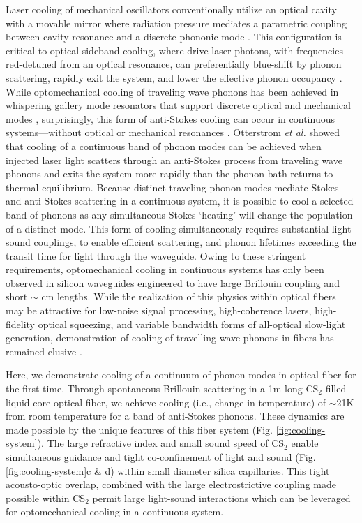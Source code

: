 Laser cooling of mechanical oscillators conventionally utilize an optical cavity with a movable mirror where radiation pressure mediates a parametric coupling between cavity resonance and a discrete phononic mode \citep{aspelmeyer2014cavity}. This configuration is critical to optical sideband cooling, where drive laser photons, with frequencies red-detuned from an optical resonance, can preferentially blue-shift by phonon scattering, rapidly exit the system, and lower the effective phonon occupancy \citep{aspelmeyer2014cavity}. While optomechanical cooling of traveling wave phonons has been achieved in whispering gallery mode resonators that support discrete optical and mechanical modes \citep{bahl2012observation}, surprisingly, this form of anti-Stokes cooling can occur in continuous systems---without optical or mechanical resonances \citep{otterstrom2018optomechanical}. Otterstrom {\it et al.} showed that cooling of a continuous band of phonon modes can be achieved when injected laser light scatters through an anti-Stokes process from traveling wave phonons and exits the system more rapidly than the phonon bath returns to thermal equilibrium.  Because distinct traveling phonon modes mediate Stokes and anti-Stokes scattering in a continuous system, it is possible to cool a selected band of phonons as any simultaneous Stokes `heating' will change the population of a distinct mode. This form of cooling simultaneously requires substantial light-sound couplings, to enable efficient scattering, and phonon lifetimes exceeding the transit time for light through the waveguide. Owing to these stringent requirements, optomechanical cooling in continuous systems has only been observed in silicon waveguides engineered to have large Brillouin coupling and short $\sim$ cm lengths. While the realization of this physics within optical fibers may be attractive for low-noise signal processing, high-coherence lasers, high-fidelity optical squeezing, and variable bandwidth forms of all-optical slow-light generation, demonstration of cooling of travelling wave phonons in fibers has remained elusive \citep{shin2015control,shelby1986generation,okawachi2005tunable}.

Here, we demonstrate cooling of a continuum of phonon modes in optical fiber for the first time. Through spontaneous Brillouin scattering in a 1m long CS$_2$-filled liquid-core optical fiber, we achieve cooling (i.e., change in temperature) of $\sim$21K from room temperature for a band of anti-Stokes phonons. These dynamics are made possible by the unique features of this fiber system (Fig. \ref{fig:cooling-system})\citep{kieu2013brillouin,kieu2014nonlinear,behunin2019spontaneous}. The large refractive index and small sound speed of CS$_2$ enable simultaneous guidance and tight co-confinement of light and sound (Fig. \ref{fig:cooling-system}c \& d) within small diameter silica capillaries. This tight acousto-optic overlap, combined with the large electrostrictive coupling made possible within CS$_2$ \citep{boyd2020nonlinear} permit large light-sound interactions which can be leveraged for optomechanical cooling in a continuous system.

